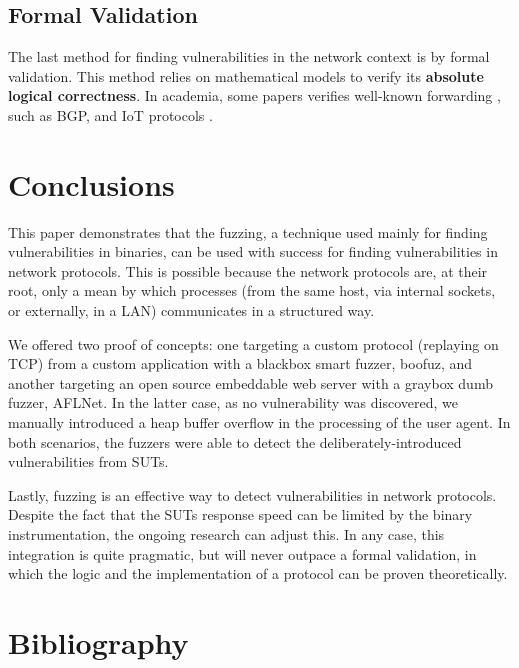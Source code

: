 \documentclass[10pt,a4paper,english,onecolumn]{IEEEtran}
\begin{document}
\subsection{Formal Validation}

The last method for finding vulnerabilities in the network context is by formal validation. This method relies on mathematical models to verify its \textbf{absolute logical correctness}. In academia, some papers verifies well-known forwarding \cite{formal_verification_bgp}, such as BGP, and IoT protocols \cite{formal_verification_iot}.

\section{Conclusions}

This paper demonstrates that the fuzzing, a technique used mainly for finding vulnerabilities in binaries, can be used with success for finding vulnerabilities in network protocols. This is possible because the network protocols are, at their root, only a mean by which processes (from the same host, via internal sockets, or externally, in a LAN) communicates in a structured way.

We offered two proof of concepts: one targeting a custom protocol (replaying on TCP) from a custom application with a blackbox smart fuzzer, boofuz, and another targeting an open source embeddable web server with a graybox dumb fuzzer, AFLNet. In the latter case, as no vulnerability was discovered, we manually introduced a heap buffer overflow in the processing of the user agent. In both scenarios, the fuzzers were able to detect the deliberately-introduced vulnerabilities from SUTs.

Lastly, fuzzing is an effective  way to detect vulnerabilities in network protocols. Despite the fact that the SUTs response speed can be limited by the binary instrumentation, the ongoing research can adjust this. In any case, this integration is quite pragmatic, but will never outpace a formal validation, in which the logic and the implementation of a protocol can be proven theoretically.

\section{Bibliography}
\nocite{*}
\printbibliography[heading=none]
\end{document}
